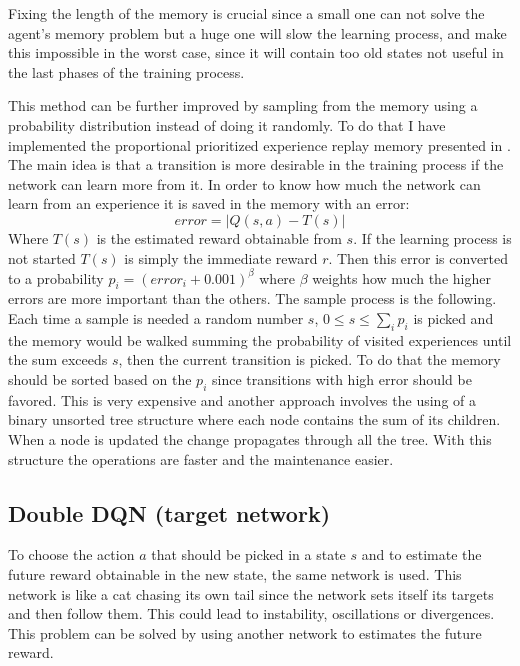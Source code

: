 \documentclass[10pt]{article}
\begin{document}
\begin{multicols}{2}
Fixing the length of the memory is crucial since a small one can not solve the agent's memory problem but a huge one will slow the learning process, and make this impossible in the worst case, since it will contain too old states not useful in the last phases of the training process.

This method can be further improved by sampling from the memory using a probability distribution instead of doing it randomly. To do that I have implemented the proportional prioritized experience replay memory presented in \cite{prioritized}. The main idea is that a transition is more desirable in the training process if the network can learn more from it. In order to know how much the network can learn from an experience it is saved in the memory with an error:
\[
error = |Q(s,a) - T(s)|
\]
Where $T(s)$ is the estimated reward obtainable from $s$. If the learning process is not started $T(s)$ is simply the immediate reward $r$. Then this error is converted to a probability $p_i= (error_i+0.001)^\beta$ where $\beta$ weights how much the higher errors are more important than the others.
The sample process is the following. Each time a sample is needed a random number $s$, $0\le s \le \sum_i p_i$ is picked and the memory would be walked summing the probability of visited experiences until the sum exceeds $s$, then the current transition is picked. To do that the memory should be sorted based on the $p_i$ since transitions with high error should be favored. This is very expensive and another approach involves the using of a binary unsorted tree structure where each node contains the sum of its children. When a node is updated the change propagates through all the tree. With this structure the operations are faster and the maintenance easier. 

\subsection{Double DQN (target network)}
To choose the action $a$ that should be picked in a state $s$ and to estimate the future reward obtainable in the new state, the same network is used. This network is like a cat chasing its own tail since the network sets itself its targets and then follow them. This could lead to instability, oscillations or divergences. This problem can be solved by using another network to estimates the future reward. 


\end{multicols}
\end{document}
